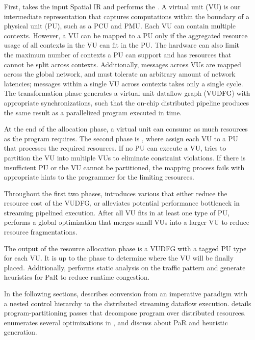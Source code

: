 First, \name takes the input Spatial IR and performs the .
A virtual unit (VU) is our intermediate representation that captures computations 
within the boundary of
a physical unit (PU), such as a PCU and PMU.
Each VU can contain multiple contexts. However, a VU can be mapped to a PU only if the aggregated
resource usage of all contexts in the VU can fit in the PU. The hardware can also limit the maximum number of contexts a PU can support and has resources that cannot be split across contexts.
Additionally, messages across VUs are mapped across the global network, and must tolerate an arbitrary amount of network latencies; messages within a single VU across contexts takes only a single cycle.
The transformation phase generates a virtual unit dataflow graph (VUDFG) with appropriate
synchronizations, such that the on-chip distributed pipeline produces the same result as a
parallelized program executed in time.

At the end of the allocation phase, a virtual unit can consume as much resources as the program
requires. The second phase is , where \name assign each VU to a
PU that processes the required resources. If no PU can execute a VU, \name tries to partition the
VU into multiple VUs to eliminate constraint violations. If there is insufficient PU or the VU cannot be partitioned, the mapping process fails with appropriate hints to the programmer for the
limiting resources.

Throughout the first two phases, \name introduces various  that either reduce the
resource cost of the VUDFG, or alleviates potential performance bottleneck in streaming pipelined execution.
After all VU fits in at least one type of PU, \name performs a global optimization that merges small VUs into a larger VU to reduce resource fragmentations.

The output of the resource allocation phase is a VUDFG with a tagged PU type for each VU.
It is up to the
 phase to determine where the VU will be finally placed.
Additionally, \name performs static analysis on the traffic pattern and generate heuristics for PaR to
reduce runtime congestion.

In the following sections,  describes conversion from an imperative paradigm with
a nested control hierarchy to the distributed streaming dataflow execution.
 details program-partitioning passes that decompose program over distributed resources.
 enumerates several optimizations in \name, and  discuss about PaR and
heuristic generation.
